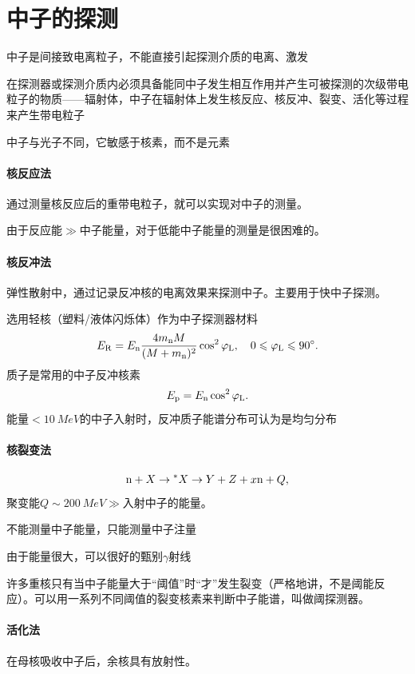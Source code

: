 \section{中子的探测}

中子是间接致电离粒子，不能直接引起探测介质的电离、激发

在探测器或探测介质内必须具备能同中子发生相互作用并产生可被探测的次级带电粒子的物质——辐射体，中子在辐射体上发生核反应、核反冲、裂变、活化等过程来产生带电粒子

中子与光子不同，它敏感于核素，而不是元素
\paragraph{核反应法}通过测量核反应后的重带电粒子，就可以实现对中子的测量。

由于反应能$\gg$中子能量，对于低能中子能量的测量是很困难的。
\paragraph{核反冲法}弹性散射中，通过记录反冲核的电离效果来探测中子。主要用于快中子探测。

选用轻核（塑料/液体闪烁体）作为中子探测器材料
\begin{equation}\label{eq:nrd-neutron-recoil-energy}
	E_{\mathrm{R}} = E_\mathrm n\frac{4m_\mathrm n M}{(M + m_\mathrm n)^2}\cos^2\varphi_\mathrm L,\quad 0 \leqslant \varphi_\mathrm L \leqslant \ang{90}.
\end{equation}
质子是常用的中子反冲核素
\begin{equation}\label{eq:nrd-recoil-proton-energy}
	E_{\mathrm{p}} = E_\mathrm n\cos^2\varphi_\mathrm L.
\end{equation}
能量$< \qty{10}{MeV}$的中子入射时，反冲质子能谱分布可认为是均匀分布
\paragraph{核裂变法}
\[
	\mathrm n + X \to {}^\ast X \to Y + Z + x\mathrm n + Q,
\]
聚变能$Q \sim \qty{200}{MeV} \gg$入射中子的能量。
\begin{compactitem}
	\item 不能测量中子能量，只能测量中子注量
	\item 由于能量很大，可以很好的甄别$\gamma$射线
\end{compactitem}
许多重核只有当中子能量大于“阈值”时“才”发生裂变（严格地讲，不是阈能反应）。可以用一系列不同阈值的裂变核素来判断中子能谱，叫做阈探测器。
\paragraph{活化法}
在母核吸收中子后，余核具有放射性。

